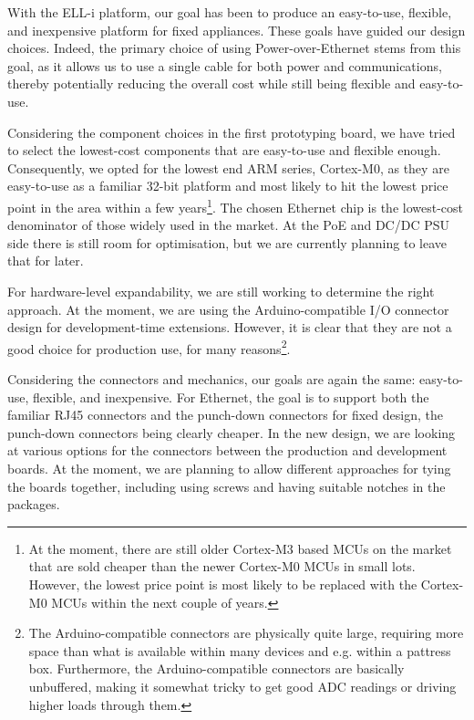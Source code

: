 \documentclass[final]{siamltex}
\begin{document}
With the ELL-i platform, our goal has been to produce an easy-to-use,
flexible, and inexpensive platform for fixed appliances.  These goals
have guided our design choices.  Indeed, the primary choice of using
Power-over-Ethernet stems from this goal, as it allows us to use a
single cable for both power and communications, thereby potentially
reducing the overall cost while still being flexible and easy-to-use.

Considering the component choices in the first prototyping board, we
have tried to select the lowest-cost components that are easy-to-use
and flexible enough.  Consequently, we opted for the lowest end ARM
series, Cortex-M0, as they are easy-to-use as a familiar 32-bit
platform and most likely to hit the lowest price point in the area
within a few years\footnote{At the moment, there are still older
  Cortex-M3 based MCUs on the market that are sold cheaper than the
  newer Cortex-M0 MCUs in small lots.  However, the lowest price
  point is most likely to be replaced with the Cortex-M0 MCUs within
  the next couple of years.}.
The chosen Ethernet chip is the lowest-cost denominator of those
widely used in the market.  At the PoE and DC/DC PSU side there is
still room for optimisation, but we are currently planning to leave
that for later.

For hardware-level expandability, we are still working to determine
the right approach.  At the moment, we are using the Arduino-compatible I/O
connector design for development-time extensions.  However, it is
clear that they are not a good choice for production use, for many
reasons\footnote{The Arduino-compatible connectors are physically quite large,
  requiring more space than what is available within many devices and
  e.g. within a pattress box.  Furthermore, the Arduino-compatible connectors are
  basically unbuffered, making it somewhat tricky to get good ADC
  readings or driving higher loads through them.}.

Considering the connectors and mechanics, our goals are again the
same: easy-to-use, flexible, and inexpensive.  For Ethernet, the goal
is to support both the familiar RJ45 connectors and the punch-down
connectors for fixed design, the punch-down connectors being clearly
cheaper.  In the new design, we are looking at various options for the
connectors between the production and development boards.  At the
moment, we are planning to allow different approaches for tying the
boards together, including using screws and having suitable notches in
the packages.
\end{document}
